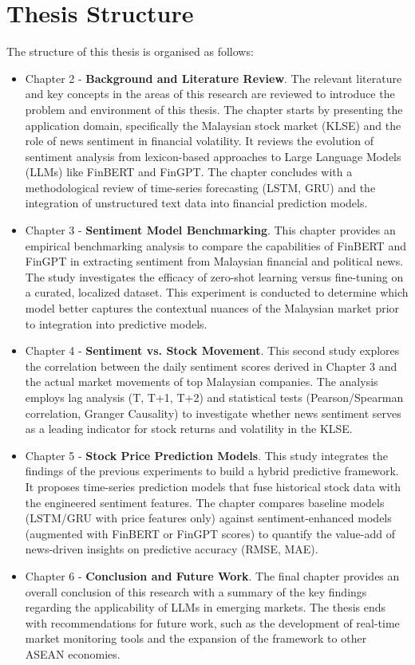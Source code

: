 \documentclass[singlespace]{ucetd}
\begin{document}
\section{Thesis Structure}
The structure of this thesis is organised as follows:
\begin{itemize}
    \item Chapter 2 - \textbf{Background and Literature Review}. The relevant literature and key concepts in the areas of this research are reviewed to introduce the problem and environment of this thesis. The chapter starts by presenting the application domain, specifically the Malaysian stock market (KLSE) and the role of news sentiment in financial volatility. It reviews the evolution of sentiment analysis from lexicon-based approaches to Large Language Models (LLMs) like FinBERT and FinGPT. The chapter concludes with a methodological review of time-series forecasting (LSTM, GRU) and the integration of unstructured text data into financial prediction models.

    \item Chapter 3 - \textbf{Sentiment Model Benchmarking}. This chapter provides an empirical benchmarking analysis to compare the capabilities of FinBERT and FinGPT in extracting sentiment from Malaysian financial and political news. The study investigates the efficacy of zero-shot learning versus fine-tuning on a curated, localized dataset. This experiment is conducted to determine which model better captures the contextual nuances of the Malaysian market prior to integration into predictive models.

    \item Chapter 4 - \textbf{Sentiment vs. Stock Movement}. This second study explores the correlation between the daily sentiment scores derived in Chapter 3 and the actual market movements of top Malaysian companies. The analysis employs lag analysis (T, T+1, T+2) and statistical tests (Pearson/Spearman correlation, Granger Causality) to investigate whether news sentiment serves as a leading indicator for stock returns and volatility in the KLSE.

    \item Chapter 5 - \textbf{Stock Price Prediction Models}. This study integrates the findings of the previous experiments to build a hybrid predictive framework. It proposes time-series prediction models that fuse historical stock data with the engineered sentiment features. The chapter compares baseline models (LSTM/GRU with price features only) against sentiment-enhanced models (augmented with FinBERT or FinGPT scores) to quantify the value-add of news-driven insights on predictive accuracy (RMSE, MAE).

    \item Chapter 6 - \textbf{Conclusion and Future Work}. The final chapter provides an overall conclusion of this research with a summary of the key findings regarding the applicability of LLMs in emerging markets. The thesis ends with recommendations for future work, such as the development of real-time market monitoring tools and the expansion of the framework to other ASEAN economies.
\end{itemize}
\end{document}
